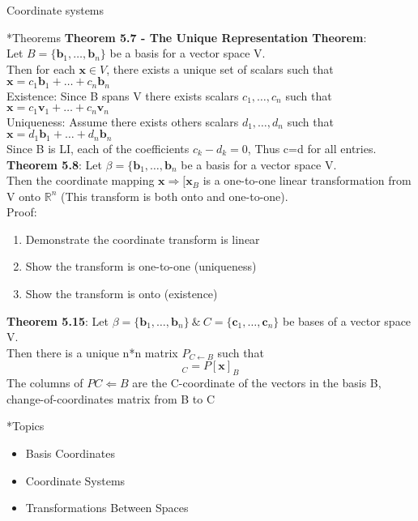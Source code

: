\documentclass[a4paper, 12pt]{article}
\begin{document}
\begin{section}{Coordinate systems}
\begin{subsection}*{Theorems}
\textbf{Theorem 5.7 - The Unique Representation Theorem}:\\
Let $B=\{\textbf{b}_{1},\dots,\textbf{b}_{n}\}$ be a basis for a vector space V.\\
Then for each $\textbf{x} \in V$, there exists a unique set of scalars such that
$\textbf{x}=c_1\textbf{b}_1+\dots+c_{n}\textbf{b}_{n}$\\
Existence: Since B spans V there exists scalars $c_1,\dots,c_{n}$ such that 
$\textbf{x}=c_1\textbf{v}_{1}+\dots+c_{n}\textbf{v}_{n}$\\
Uniqueness: Assume there exists others scalars $d_1,\dots,d_{n}$ such that 
$\textbf{x}=d_1\textbf{b}_{1}+\dots+d_{n}\textbf{b}_{n}$\\
Since B is LI, each of the coefficients $c_{k}-d_{k}=0$, Thus c=d for all entries.
\\ \noindent \textbf{Theorem 5.8}: Let $\beta=\{\textbf{b}_{1},\dots,\textbf{b}_{n}$
be a basis for a vector space V.\\
Then the coordinate mapping $\textbf{x}\Rightarrow [\textbf{x}_{B}$ is a
one-to-one linear transformation from V onto $\mathbb{R}^{n}$ (This transform is 
both onto and one-to-one). \\
Proof:
\begin{enumerate}
\item{Demonstrate the coordinate transform is linear}
\item{Show the transform is one-to-one (uniqueness)}
\item{Show the transform is onto (existence)}
\end{enumerate}
\noindent \textbf{Theorem 5.15}: Let $\beta=\{\textbf{b}_{1},\dots,\textbf{b}_{n}
\} ~\& ~ C=\{\textbf{c}_{1},\dots,\textbf{c}_{n}\}$ be bases of a vector space V.\\
Then there is a unique n*n matrix $P_{C\gets B}$ such that 
\begin{equation}
	[\textbf{x}]_{C}=P[\textbf{x}]_{B}
\end{equation}
The columns of $P C \Leftarrow B$ are the C-coordinate of the vectors in the 
basis B, change-of-coordinates matrix from B to C 
\end{subsection}
\begin{subsection}*{Topics}
\begin{itemize}
\item{Basis Coordinates}
\item{Coordinate Systems}
\item{Transformations Between Spaces}


\end{itemize}
\end{subsection}
\end{section}
\end{document}
